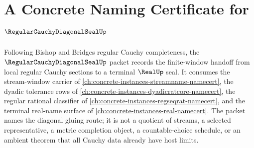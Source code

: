 \chapter{A Concrete Naming Certificate for $\RegularCauchyDiagonalSealUp$}
\label{ch:concrete-instances-regular-cauchy-diagonal-seal-namecert}

Following Bishop and Bridges regular Cauchy completeness, the $\RegularCauchyDiagonalSealUp$ packet records the finite-window handoff from local regular Cauchy sections to a terminal $\RealUp$ seal. It consumes the stream-window carrier of \autoref{ch:concrete-instances-streamname-namecert}, the dyadic tolerance rows of \autoref{ch:concrete-instances-dyadicratcore-namecert}, the regular rational classifier of \autoref{ch:concrete-instances-regseqrat-namecert}, and the terminal real-name surface of \autoref{ch:concrete-instances-real-namecert}. The packet names the diagonal gluing route; it is not a quotient of streams, a selected representative, a metric completion object, a countable-choice schedule, or an ambient theorem that all Cauchy data already have host limits.

